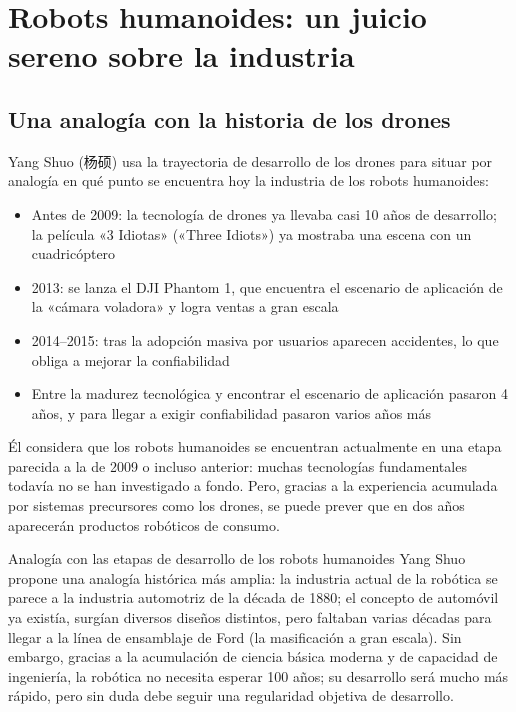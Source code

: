 \section{Robots humanoides: un juicio sereno sobre la industria}

\subsection{Una analogía con la historia de los drones}

Yang Shuo (杨硕) usa la trayectoria de desarrollo de los drones para situar por analogía en qué punto se encuentra hoy la industria de los robots humanoides:

\begin{itemize}
    \item Antes de 2009: la tecnología de drones ya llevaba casi 10 años de desarrollo; la película «3 Idiotas» («Three Idiots») ya mostraba una escena con un cuadricóptero
    \item 2013: se lanza el DJI Phantom 1, que encuentra el escenario de aplicación de la «cámara voladora» y logra ventas a gran escala
    \item 2014--2015: tras la adopción masiva por usuarios aparecen accidentes, lo que obliga a mejorar la confiabilidad
    \item Entre la madurez tecnológica y encontrar el escenario de aplicación pasaron 4 años, y para llegar a exigir confiabilidad pasaron varios años más
\end{itemize}

Él considera que los robots humanoides se encuentran actualmente en una etapa parecida a la de 2009 o incluso anterior: muchas tecnologías fundamentales todavía no se han investigado a fondo. Pero, gracias a la experiencia acumulada por sistemas precursores como los drones, se puede prever que en dos años aparecerán productos robóticos de consumo.

\begin{importantbox}{Analogía con las etapas de desarrollo de los robots humanoides}
Yang Shuo propone una analogía histórica más amplia: la industria actual de la robótica se parece a la industria automotriz de la década de 1880; el concepto de automóvil ya existía, surgían diversos diseños distintos, pero faltaban varias décadas para llegar a la línea de ensamblaje de Ford (la masificación a gran escala). Sin embargo, gracias a la acumulación de ciencia básica moderna y de capacidad de ingeniería, la robótica no necesita esperar 100 años; su desarrollo será mucho más rápido, pero sin duda debe seguir una regularidad objetiva de desarrollo.
\end{importantbox}

